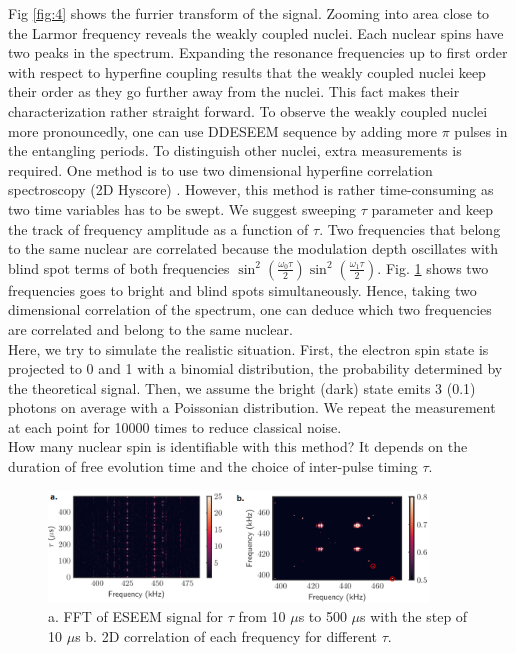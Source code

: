 \documentclass[%
 reprint,
superscriptaddress,
 amsmath,amssymb,
 aps,
]{revtex4-2}
\begin{document}
Fig \ref{fig:4} shows the furrier transform of the signal. Zooming into area close to the Larmor frequency reveals the weakly coupled nuclei. Each nuclear spins have two peaks in the spectrum. Expanding the resonance frequencies up to first order with respect to hyperfine coupling results that the weakly coupled nuclei keep their order as they go further away from the nuclei. This fact makes their characterization rather straight forward. To observe the weakly coupled nuclei more pronouncedly, one can use DDESEEM sequence by adding more $\pi$ pulses in the entangling periods. To distinguish other nuclei, extra measurements is required. One method is to use two dimensional hyperfine correlation spectroscopy (2D Hyscore)  \cite{vorobyov2022addressing}. However, this method is rather time-consuming as two time variables has to be swept. We suggest sweeping $\tau$ parameter and keep the track of frequency amplitude as a function of $\tau$. Two frequencies that belong to the same nuclear are correlated because the modulation depth oscillates with blind spot terms of both frequencies $\sin^2(\frac{\omega_0 \tau}{2}) \sin^2(\frac{\omega_1 \tau}{2})$. Fig. \ref{fig:5} shows two frequencies goes to bright and blind spots simultaneously. Hence, taking two dimensional correlation of the spectrum, one can deduce which two frequencies are correlated and belong to the same nuclear. \\

Here, we try to simulate the realistic situation. First, the electron spin state is projected to 0 and 1 with a binomial distribution, the probability determined by the theoretical signal. Then, we assume the bright (dark) state emits 3 (0.1) photons on average with a Poissonian distribution. We repeat the measurement at each point for 10000 times to reduce classical noise.\\
How many nuclear spin is identifiable with this method? It depends on the duration of free evolution time and the choice of inter-pulse timing $\tau$.

\begin{figure}%
	\begin{center}
		\includegraphics[width=0.9\textwidth]{pict/fig5.png}
		\caption{a. FFT of ESEEM signal for $\tau$ from 10 $\mu$s to 500 $\mu$s with the step of 10 $\mu$s b. 2D correlation of each frequency for different $\tau$.}
		\label{fig:5}
	\end{center}
\end{figure}
\end{document}
